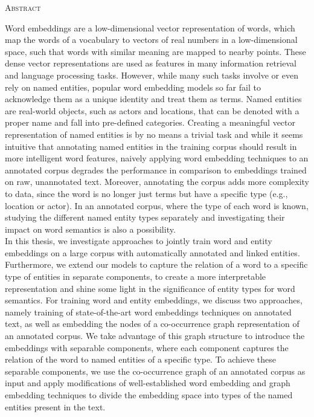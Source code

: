 \begin{center}
  \textsc{Abstract}
\end{center}
%
\noindent
%
Word embeddings are a low-dimensional vector representation of words, which map the words of a vocabulary to vectors of real numbers in a low-dimensional space, such that words with similar meaning are mapped to nearby points. These dense vector representations are used as features in many information retrieval and language processing tasks. However, while many such tasks involve or even rely on named entities, popular word embedding models so far fail to acknowledge them as a unique identity and treat them as terms. Named entities are real-world objects, such as actors and locations, that can be denoted with a proper name and fall into pre-defined categories. Creating a meaningful vector representation of named entities is by no means a trivial task and while it seems intuitive that annotating named entities in the training corpus should result in more intelligent word features, naively applying word embedding techniques to an annotated corpus degrades the performance in comparison to embeddings trained on raw, unannotated text. Moreover, annotating the corpus adds more complexity to data, since the word is no longer just terms but have a specific type (e.g., location or actor). In an annotated corpus, where the type of each word is known, studying the different named entity types separately and investigating their impact on word semantics is also a possibility. \\
In this thesis, we investigate approaches to jointly train word and entity embeddings on a large corpus with automatically annotated and linked entities. Furthermore, we extend our models to capture the relation of a word to a specific type of entities in separate components, to create a more interpretable representation and shine some light in the significance of entity types for word semantics. For training word and entity embeddings, we discuss two approaches, namely training of state-of-the-art word embeddings techniques on annotated text, as well as embedding the nodes of a co-occurrence graph representation of an annotated corpus. We take advantage of this graph structure to introduce the embeddings with separable components, where each component captures the relation of the word to named entities of a specific type. To achieve these separable components, we use the co-occurrence graph of an annotated corpus as input and apply modifications of well-established word embedding and graph embedding techniques to divide the embedding space into types of the named entities present in the text. \\
